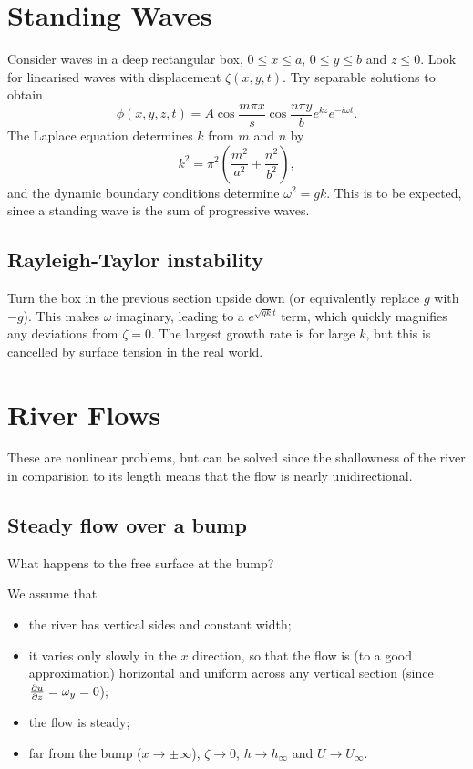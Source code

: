 \documentclass{notes}
\begin{document}
\section{Standing Waves}

Consider waves in a deep rectangular box, $0 \le x \le a$, $0 \le y
\le b$ and $z \le 0$.  Look for linearised waves with displacement
$\zeta(x,y,t)$.  Try separable solutions to obtain
\[
\phi (x,y,z,t) = A \cos \frac{m \pi x}{s} \cos \frac{n \pi y}{b} e^{k
  z} e^{-i \omega t}.
\]
The Laplace equation determines $k$ from $m$ and $n$ by
\[
k^2 = \pi^2 \left( \frac{m^2}{a^2} + \frac{n^2}{b^2} \right),
\] and the dynamic boundary conditions determine $\omega^2 = g k$.  This is to
be expected, since a standing wave is the sum of progressive waves.

\subsection{Rayleigh-Taylor instability}

Turn the box in the previous section upside down (or equivalently
replace $g$ with $-g$).  This makes $\omega$ imaginary, leading to a
$e^{\sqrt{g k}t}$ term, which quickly magnifies any deviations from
$\zeta = 0$.  The largest growth rate is for large $k$, but this is
cancelled by surface tension in the real world.

\section{River Flows}

These are nonlinear problems, but can be solved since the shallowness
of the river in comparision to its length means that the flow is
nearly unidirectional.

\subsection{Steady flow over a bump}\label{sec:riverbump}

\vspace{1.5in}

What happens to the free surface at the bump?

We assume that

\begin{itemize}
\item the river has vertical sides and constant width;
\item it varies only slowly in the $x$ direction, so that the flow is
  (to a good approximation) horizontal and uniform across any vertical
  section (since $\frac{\partial u}{\partial z} = \omega_y = 0$);
\item the flow is steady;
\item far from the bump ($x \to \pm \infty$), $\zeta \to 0$, $h \to
  h_\infty$ and $U \to U_\infty$.
\end{itemize}
\end{document}

